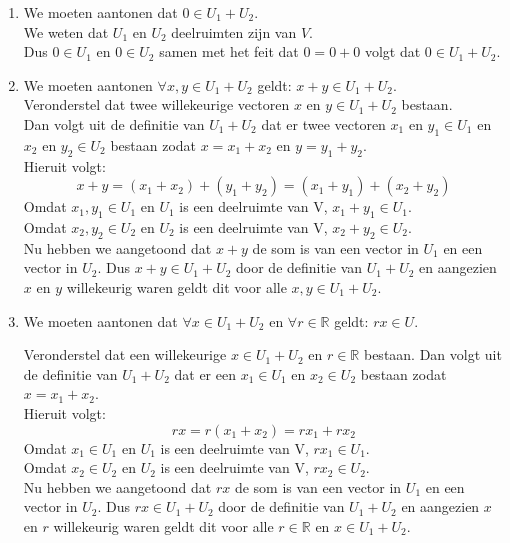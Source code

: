 \documentclass[lineaire_algebra_oplossingen.tex]{subfiles}
\begin{document}
\begin{enumerate}
\item We moeten aantonen dat $0 \in U_1 + U_2$.\\
We weten dat $U_1$ en $U_2$ deelruimten zijn van $V$.\\
Dus $0 \in U_1$ en $0 \in U_2$ samen met het feit dat $0 = 0 + 0$ volgt dat $0 \in U_1 + U_2$.

\item We moeten aantonen $\forall x,y \in U_1 + U_2$ geldt: $x + y \in U_1 + U_2$.\\
Veronderstel dat twee willekeurige vectoren $x$ en $y \in U_1 + U_2$ bestaan.\\
Dan volgt uit de definitie van $U_1 + U_2$ dat er twee vectoren $x_1$ en $y_1 \in U_1$ en $x_2$ en $y_2 \in U_2$ bestaan zodat $x = x_1 + x_2$ en $y = y_1 + y_2$.\\
Hieruit volgt:
$$x + y = (x_1 + x_2) + (y_1 + y_2) = (x_1 + y_1) + (x_2 + y_2)$$
Omdat $x_1, y_1 \in U_1$ en $U_1$ is een deelruimte van V, $x_1 + y_1 \in U_1$.\\
Omdat $x_2, y_2 \in U_2$ en $U_2$ is een deelruimte van V, $x_2 + y_2 \in U_2$.\\
Nu hebben we aangetoond dat $x+y$ de som is van een vector in $U_1$ en een vector in $U_2$. 
Dus $x + y \in U_1 + U_2$ door de definitie van $U_1 + U_2$ en aangezien $x$ en $y$ willekeurig waren geldt dit voor alle $x,y \in U_1 + U_2$.

\item We moeten aantonen dat $\forall x \in U_1 + U_2$ en $\forall r \in \mathbb{R}$ geldt: $rx \in U$.

Veronderstel dat een willekeurige $x \in U_1 + U_2$ en $r \in \mathbb{R}$ bestaan. Dan volgt uit de definitie van $U_1 + U_2$ dat er een $x_1 \in U_1$ en $x_2 \in U_2$ bestaan zodat $x = x_1 + x_2$.\\
Hieruit volgt:
$$rx = r(x_1+x_2) = rx_1+rx_2$$
Omdat $x_1 \in U_1$ en $U_1$ is een deelruimte van V, $rx_1 \in U_1$.\\
Omdat $x_2 \in U_2$ en $U_2$ is een deelruimte van V, $rx_2 \in U_2$.\\
Nu hebben we aangetoond dat $rx$ de som is van een vector in $U_1$ en een vector in $U_2$. 
Dus $rx \in U_1 + U_2$ door de definitie van $U_1 + U_2$ en aangezien $x$ en $r$ willekeurig waren geldt dit voor alle $r \in \mathbb{R}$ en $x \in U_1 + U_2$.
\end{enumerate}
\end{document}
